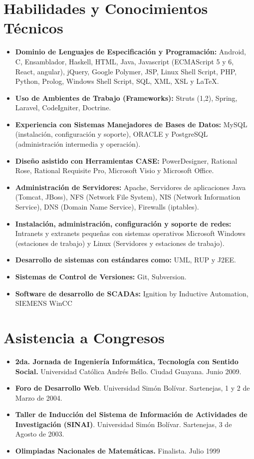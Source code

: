 \documentclass[letterpaper,11pt]{report}
\begin{document}
\section*{Habilidades y Conocimientos Técnicos}
\begin{itemize}
\item \textbf{Dominio de Lenguajes de Especificación y Programación:} Android, C, Ensamblador, Haskell, HTML, Java, Javascript (ECMAScript 5 y 6, React, angular), jQuery, Google Polymer, JSP, Linux Shell Script, PHP, Python, Prolog, Windows Shell Script, SQL, XML, XSL y LaTeX.
\item \textbf{Uso de Ambientes de Trabajo (Frameworks):} Struts (1,2), Spring, Laravel, CodeIgniter, Doctrine.
\item \textbf{Experiencia con Sistemas Manejadores de Bases de Datos:} MySQL (instalación, configuración y soporte), ORACLE y PostgreSQL (administración intermedia y operación).
\item \textbf{Dise\~{n}o asistido con Herramientas CASE:} PowerDesigner, Rational Rose, Rational Requisite Pro, Microsoft Visio y Microsoft Office.
\item \textbf{Administración de Servidores:} Apache, Servidores de aplicaciones Java (Tomcat, JBoss), NFS (Network File System), NIS (Network Information Service), DNS (Domain Name Service), Firewalls (iptables).
\item \textbf{Instalación, administración, configuración y soporte de redes:} Intranets y extranets peque\~{n}as con sistemas operativos Microsoft Windows (estaciones de trabajo) y Linux (Servidores y estaciones de trabajo).
\item \textbf{Desarrollo de sistemas con estándares como:} UML, RUP y J2EE.
\item \textbf{Sistemas de Control de Versiones:} Git, Subversion.
\item \textbf{Software de desarrollo de SCADAs:} Ignition by Inductive Automation, SIEMENS WinCC
\end{itemize}

\section*{Asistencia a Congresos}
\begin{itemize}
\item
\textbf{2da. Jornada de Ingeniería Informática, Tecnología con Sentido Social.} Universidad Católica Andrés Bello. Ciudad Guayana. Junio 2009.
\item
\textbf{Foro de Desarrollo Web}. Universidad Simón Bolívar. Sartenejas, 1 y 2 de Marzo de 2004.
\item
\textbf{Taller de Inducción del Sistema de Información de Actividades de Investigación (SINAI)}. Universidad Simón Bolívar. Sartenejas, 3 de Agosto de 2003.
\item
\textbf{Olimpiadas Nacionales de Matemáticas.} Finalista. Julio 1999
\end{itemize}
\end{document}
